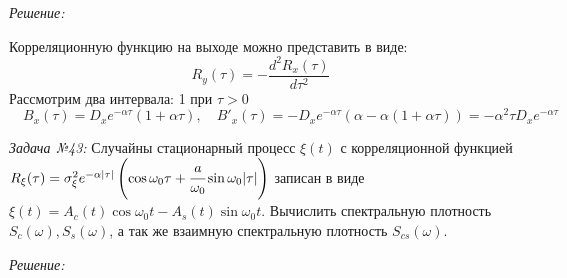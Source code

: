 \documentclass[14pt,final,titlepage,pscyr]{hedwork}
\begin{document}
\emph{Решение:}

Корреляционную функцию на выходе можно представить в виде:
\[
    R_y(\tau) = -\frac{d^2 R_x(\tau)}{d\tau^2}
\]
Рассмотрим два интервала: 1 при \( \tau > 0 \)
\[
    \quad B_x(\tau) = D_x e^{-\alpha\tau}(1+\alpha\tau), \quad
    B'_x(\tau) = -D_x e^{-\alpha\tau}(\alpha-\alpha(1+\alpha\tau)) = 
    -\alpha^2\tau D_x e^{-\alpha\tau}
\]

\newpage

\emph{Задача №43:} Случайны стационарный процесс \( \xi(t) \) с корреляционной 
функцией 
\( 
    R_\xi(\tau) = \sigma_\xi^2 e^{-\alpha|\tau|} \left( 
        \cos\omega_0\tau + \cfrac{a}{\omega_0}\sin\omega_0|\tau| 
    \right)
\) записан в виде \\ 
\( \xi(t) = A_c(t)\cos\omega_0 t - A_s(t)\sin\omega_0 t \). 
Вычислить спектральную плотность \( S_c(\omega), S_s(\omega) \), а так же 
взаимную спектральную плотность \( S_{cs}(\omega) \).

\emph{Решение:}
\end{document}
